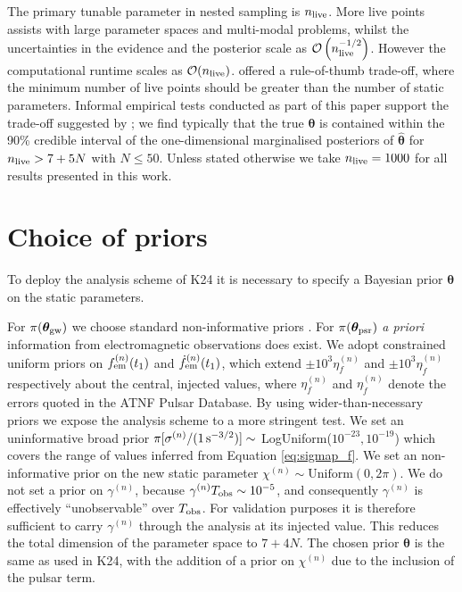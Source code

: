 \documentclass[fleqn,usenatbib,useAMS]{mnras}
\begin{document}
The primary tunable parameter in nested sampling is $n_{\rm live}$. More live points assists with large parameter spaces and multi-modal problems, whilst the uncertainties in the evidence and the posterior scale as $\mathcal{O}\left(n_{\rm live}^{-1/2}\right)$. However the computational runtime scales as $\mathcal{O}(n_{\rm live})$. \cite{Ashton2022} offered a rule-of-thumb trade-off, where the minimum number of live points should be greater than the number of static parameters. Informal empirical tests conducted as part of this paper support the trade-off suggested by \cite{Ashton2022}; we find typically that the true ${\boldsymbol{\theta}}$ is contained within the 90\% credible interval of the one-dimensional marginalised posteriors of ${\boldsymbol{\hat{\theta}}}$ for $n_{\rm live} > 7 + 5N$ with $N \leq 50$. Unless stated otherwise we take $n_{\rm live} = 1000$ for all results presented in this work. \newline 


\section{Choice of priors}\label{sec:set_priors}
To deploy the analysis scheme of K24 it is necessary to specify a Bayesian prior $\boldsymbol{\theta}$ on the static parameters. \newline 

For $\pi(\boldsymbol{\theta}_{\rm gw})$ we choose standard non-informative priors \citep[e.g.][]{Bhagwat2021}. For $\pi(\boldsymbol{\theta}_{\rm psr})$ \textit{a priori} information from electromagnetic observations does exist. We adopt constrained uniform priors on $f_{\rm em}^{(n)}(t_1)$ and $\dot{f}_{\rm em}^{(n)}(t_1)$, which extend $\pm 10^3 \eta_f^{(n)}$ and $\pm 10^3 \eta_{\dot{f}}^{(n)}$ respectively about the central, injected values, where $\eta_f^{(n)}$ and $\eta_{\dot{f}}^{(n)}$ denote the errors quoted in the ATNF Pulsar Database. By using wider-than-necessary priors we expose the analysis scheme to a more stringent test. We set an uninformative broad prior $\pi[\sigma^{(n)} / (1 \, {\rm s^{-3/2}})] \sim$ LogUniform($10^{-23}, 10^{-19}$) which covers the range of values inferred from Equation \ref{eq:sigmap_f}. We set an non-informative prior on the new static parameter $\chi^{(n)} \sim \text{Uniform}\left(0,2\pi\right)$. We do not set a prior on $\gamma^{(n)}$, because $\gamma^{(n)} T_{\rm obs} \sim 10^{-5}$, and consequently $\gamma^{(n)}$ is effectively ``unobservable'' over $T_{\rm obs}$. For validation purposes it is therefore sufficient to carry $\gamma^{(n)}$ through the analysis at its injected value. This reduces the total dimension of the parameter space to $7 + 4N$. The chosen prior $\boldsymbol{\theta}$ is the same as used in K24, with the addition of a prior on $\chi^{(n)}$ due to the inclusion of the pulsar term. \newline 
\end{document}
